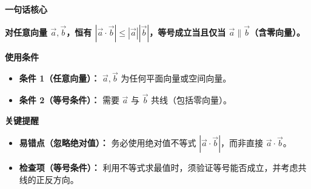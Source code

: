 \begin{summarybox}
	\textbf{\textcolor{CSummary}{一句话核心}}

	\textbf{对任意向量 $\vec{a},\vec{b}$，恒有 $|\vec{a}\cdot\vec{b}| \le |\vec{a}||\vec{b}|$，等号成立当且仅当 $\vec{a}\parallel\vec{b}$（含零向量）。}

	\medskip
	\textbf{\textcolor{CSummary}{使用条件}}

	\begin{itemize}[leftmargin=*, itemsep=0.5em, topsep=0.4em]
		\item \textbf{条件 1（任意向量）：} $\vec{a},\vec{b}$ 为任何平面向量或空间向量。
		\item \textbf{条件 2（等号条件）：} 需要 $\vec{a}$ 与 $\vec{b}$ 共线（包括零向量）。
	\end{itemize}

	\medskip
	\textbf{\textcolor{CSummary}{关键提醒}}

	\begin{itemize}[leftmargin=*, itemsep=0.5em, topsep=0.4em]
		\item \textbf{易错点（忽略绝对值）：} 务必使用绝对值不等式 $|\vec{a}\cdot\vec{b}|$，而非直接 $\vec{a}\cdot\vec{b}$。
		\item \textbf{检查项（等号条件）：} 利用不等式求最值时，须验证等号能否成立，并考虑共线的正反方向。
	\end{itemize}
\end{summarybox}